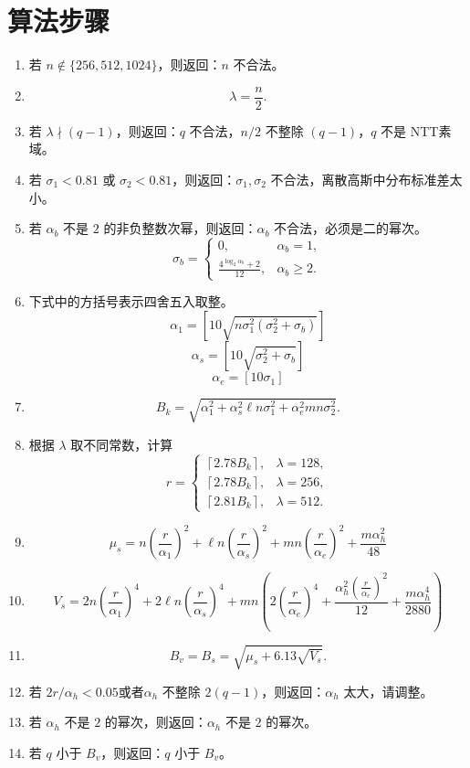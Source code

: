 \documentclass[11pt]{article}
\newcommand{\zh}[1]{{\zhfont #1}}
\begin{document}
\section*{\zh{算法步骤}}
\begin{enumerate}
  \item {\zhfont 若 $n\notin\{256,512,1024\}$，则返回：$n$ 不合法。}
  \item \[
    \lambda = \frac{n}{2}.
  \]
  \item {\zhfont 若 $\lambda\nmid(q-1)$，则返回：$q$ 不合法，$n/2$ 不整除 $(q-1)$，$q$ 不是 }NTT{\zhfont 素域。}
  \item {\zhfont 若 $\sigma_1<0.81$ 或 $\sigma_2<0.81$，则返回：$\sigma_1,\sigma_2$ 不合法，离散高斯中分布标准差太小。}
  
  \item {\zhfont 若 $\alpha_b$ 不是 $2$ 的非负整数次幂，则返回：$\alpha_b$ 不合法，必须是二的幂次。}
  \[
  \sigma_b = 
    \begin{cases}
      0, & \alpha_b = 1,\\[0.3em]
      \frac{4^{\log_2 \alpha_b}+2}{12} ,& \alpha_b \ge 2.
    \end{cases}
  \]
  \item {\zhfont 下式中的方括号表示四舍五入取整。}
  \[
    \alpha_1 = \left[ 10\sqrt{n\sigma_1^2(\sigma_2^2+\sigma_b)} \right]
  \]
  \[
    \alpha_s = \left[ 10\sqrt{\sigma_2^2+\sigma_b} \right]
  \]
  \[
    \alpha_e = \left[ 10\sigma_1 \right]
  \]


  \item \[
    B_k = \sqrt{\alpha_1^2 + \alpha_s^2 \ell n\sigma_1^2 + \alpha_e^2 mn\sigma_2^2}.
  \]
  \item {\zhfont 根据 $\lambda$ 取不同常数，计算}
  \[
    r=
    \begin{cases}
      \left\lceil 2.78B_k\right\rceil, & \lambda=128,\\[0.5em]
      \left\lceil 2.78B_k\right\rceil, & \lambda=256,\\[0.5em]
      \left\lceil 2.81B_k\right\rceil, & \lambda=512.
    \end{cases}
  \]
  \item \[
\mu_s = n (\frac{r}{\alpha_1})^2 + \ell n (\frac{r}{\alpha_s})^2 + mn(\frac{r}{\alpha_e})^2 + \frac{m \alpha_h^2}{48}
\]

  \item 
\[
V_s = 2n (\frac{r}{\alpha_1})^4 + 2\ell n (\frac{r}{\alpha_s})^4 + mn(2(\frac{r}{\alpha_e})^4 + \frac{\alpha_h^2  (\frac{r}{\alpha_e})^2}{12} +\frac{m \alpha_h^4}{2880})
\]


  \item \[
    B_v= B_s = \sqrt{\mu_s + 6.13\sqrt{V_s}}.
  \]

  \item {\zhfont 若 $2r/\alpha_h < 0.05$或者$\alpha_h$ 不整除 $2(q-1)$，则返回：$\alpha_h$ 太大，请调整。}
  \item {\zhfont 若 $\alpha_h$ 不是 $2$ 的幂次，则返回：$\alpha_h$ 不是 $2$ 的幂次。}
  \item {\zhfont 若 $q$ 小于 $B_v$，则返回：$q$ 小于 $B_v$。}
\end{enumerate}
  
\end{document}
